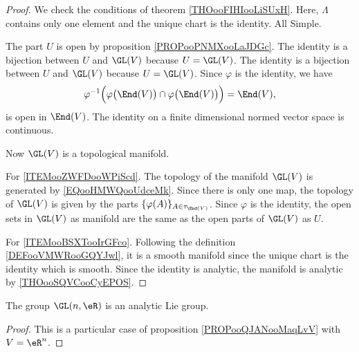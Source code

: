 \begin{proof}
	We check the conditions of theorem \ref{THOooFIHIooLiSUxH}. Here, \( \Lambda\) contains only one element and the unique chart is the identity. All Simple.

	\begin{subproof}
		The part \( U\) is open by proposition \ref{PROPooPNMXooLaJDGc}.
		The identity is a bijection between \( U\) and \( \GL(V)\) because \( U=\GL(V)\).
		The identity is a bijection between \( U\) and \( \GL(V)\) because \( U=\GL(V)\).
		Since \( \varphi\) is the identity, we have
		\begin{equation}
			\varphi^{-1}\Big(   \varphi\big( \End(V) \big)\cap\varphi\big( \End(V) \big)   \Big)=\End(V),
		\end{equation}
		is open in \( \End(V)\).
		The identity on a finite dimensional normed vector space is continuous.
	\end{subproof}
	Now \( \GL(V)\) is a topological manifold.

	For \ref{ITEMooZWFDooWPiScd}. The topology of the manifold \( \GL(V)\) is generated by \eqref{EQooHMWQooUdceMk}. Since there is only one map, the topology of \( \GL(V)\) is given by the parts \( \{ \varphi(A) \}_{A\in \tau_{\End(V)}}\). Since \( \varphi\) is the identity, the open sets in \( \GL(V)\) as manifold are the same as the open parts of \( \GL(V)\) as \( U\).

	For \ref{ITEMooBSXTooIrGFco}. Following the definition \ref{DEFooVMWRooGQYJwl}, it is a smooth manifold since the unique chart is the identity which is smooth. Since the identity is analytic, the manifold is analytic by \ref{THOooSQVCooCyEPOS}.
\end{proof}


\begin{proposition}		\label{PROPooPZABooXxQkFi}
	The group \( \GL(n,\eR)\) is an analytic Lie group.
\end{proposition}

\begin{proof}
	This is a particular case of proposition \ref{PROPooQJANooMaqLvV} with \( V=\eR^n\).
\end{proof}

